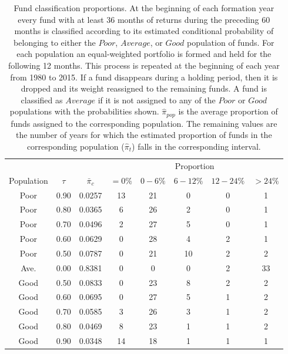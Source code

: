 		\begin{table}[p]
			\centering
			\small
			\begin{tabular}{*{8}{c}}
			\toprule
			& & &\multicolumn{5}{c}{Proportion} \\
			\cmidrule{4-8}
			Population & $\tau$ & $\bar{\pi}_c$ & $=0\%$ & $0-6\%$ & $6-12\%$ & $12-24\%$ & $>24\%$ \\
			\midrule
			Poor & 0.90 & 0.0257 &    13 &    21 &     0 &     0 &     1 \\
			Poor & 0.80 & 0.0365 &     6 &    26 &     2 &     0 &     1 \\
			Poor & 0.70 & 0.0496 &     2 &    27 &     5 &     0 &     1 \\
			Poor & 0.60 & 0.0629 &     0 &    28 &     4 &     2 &     1 \\
			Poor & 0.50 & 0.0787 &     0 &    21 &    10 &     2 &     2 \\
			Ave. & 0.00 & 0.8381 &     0 &     0 &     0 &     2 &    33 \\
			Good & 0.50 & 0.0833 &     0 &    23 &     8 &     2 &     2 \\
			Good & 0.60 & 0.0695 &     0 &    27 &     5 &     1 &     2 \\
			Good & 0.70 & 0.0585 &     3 &    26 &     3 &     1 &     2 \\
			Good & 0.80 & 0.0469 &     8 &    23 &     1 &     1 &     2 \\
			Good & 0.90 & 0.0348 &    14 &    18 &     1 &     1 &     1 \\
			\bottomrule
			\end{tabular}
			\captionsetup{position=below, font=footnotesize, justification=justified, width=0.86\linewidth}
			\caption[Fund classification proportions]{Fund classification proportions. At the beginning of each formation year every fund with at least 36 months of returns during the preceding 60 months is classified according to its estimated conditional probability of belonging to either the $Poor$, $Average$, or $Good$ population of funds. For each population an equal-weighted portfolio is formed and held for the following 12 months. This process is repeated at the beginning of each year from 1980 to 2015. If a fund disappears during a holding period, then it is dropped and its weight reassigned to the remaining funds.  A fund is classified as $Average$ if it is not assigned to any of the $Poor$ or $Good$ populations with the probabilities shown. $\hat{\pi}_{pop}$ is the average proportion of funds assigned to the corresponding population. The remaining values are the number of years for which the estimated proportion of funds in the corresponding population ($\hat{\pi}_t$) falls in the corresponding interval.}
			\label{tab:proportions}
		\end{table}

